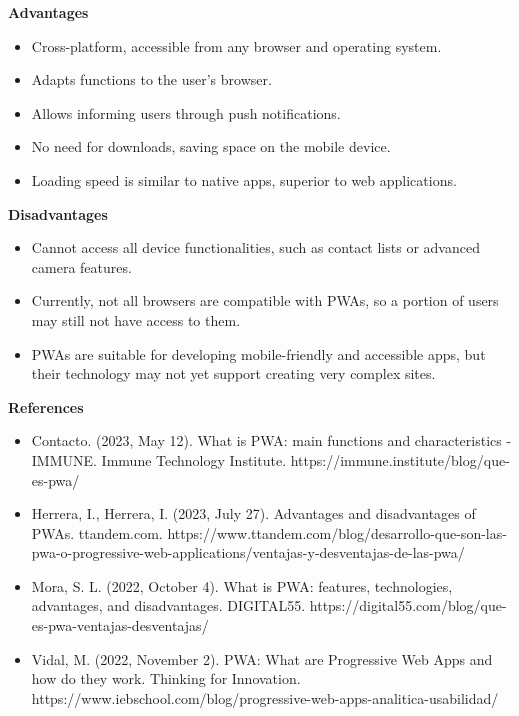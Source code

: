 \documentclass[]{report}
\begin{document}
\vspace{4em} 
\newpage

\begin{flushleft}   
    \textbf{\LARGE Advantages}
\end{flushleft}
\begin{flushleft}
    \begin{itemize}
        \item Cross-platform, accessible from any browser and operating system.
        \item Adapts functions to the user's browser.
        \item Allows informing users through push notifications.
        \item No need for downloads, saving space on the mobile device.
        \item Loading speed is similar to native apps, superior to web applications.
    \end{itemize}
\end{flushleft}
\begin{flushleft}   
    \textbf{\LARGE Disadvantages}
\end{flushleft}
\begin{flushleft}
    \begin{itemize}
        \item Cannot access all device functionalities, such as contact lists or advanced camera features.
        \item Currently, not all browsers are compatible with PWAs, so a portion of users may still not have access to them.
        \item PWAs are suitable for developing mobile-friendly and accessible apps, but their technology may not yet support creating very complex sites.
    \end{itemize}
\end{flushleft}
\begin{flushleft}
    \textbf{\LARGE References}
\end{flushleft}
\begin{flushleft}
    \begin{itemize}
        \item Contacto. (2023, May 12). What is PWA: main functions and characteristics - IMMUNE. Immune Technology Institute. https://immune.institute/blog/que-es-pwa/
        \item Herrera, I., Herrera, I. (2023, July 27). Advantages and disadvantages of PWAs. ttandem.com. https://www.ttandem.com/blog/desarrollo-que-son-las-pwa-o-progressive-web-applications/ventajas-y-desventajas-de-las-pwa/
        \item Mora, S. L. (2022, October 4). What is PWA: features, technologies, advantages, and disadvantages. DIGITAL55. https://digital55.com/blog/que-es-pwa-ventajas-desventajas/
        \item Vidal, M. (2022, November 2). PWA: What are Progressive Web Apps and how do they work. Thinking for Innovation. https://www.iebschool.com/blog/progressive-web-apps-analitica-usabilidad/
    \end{itemize}
\end{flushleft}
\end{document}

